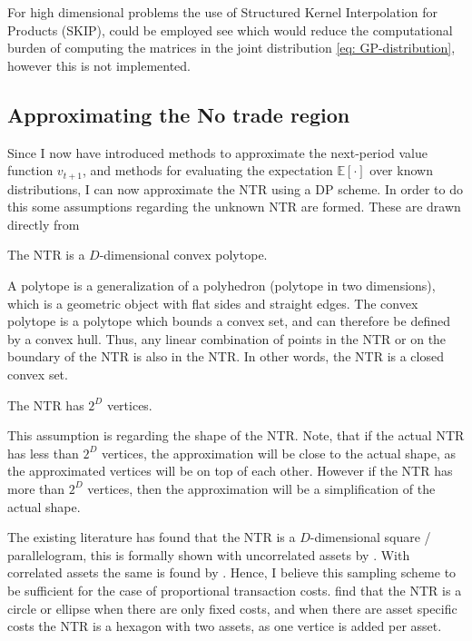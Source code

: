 \documentclass[11pt]{article}
\begin{document}
For high dimensional problems the use of Structured Kernel Interpolation for Products (SKIP), could be employed see \autocite{Garnder2018}
which would reduce the computational burden of computing the matrices in the joint distribution \eqref{eq: GP-distribution},
however this is not implemented.


\subsection{Approximating the No trade region} \label{Subsection: Approximating_NTR}
Since I now have introduced methods to approximate the next-period value function $v_{t+1}$, and methods for evaluating the expectation $\mathbb{E}[\cdot]$
over known distributions, I can now approximate the \ac{NTR} using a \ac{DP} scheme. In order to do this some assumptions regarding the unknown NTR are formed.
These are drawn directly from \autocite{Scheidegger2023}
\begin{assumption}\label{assumption: NTR-convex}
  The NTR is a $D$-dimensional convex polytope.
\end{assumption}
A polytope is a generalization of a polyhedron (polytope in two dimensions), which is a geometric object with flat sides and straight edges.
  The convex polytope is a polytope which bounds a convex set, and can therefore be defined by a convex hull. Thus, any linear combination of points in the \ac{NTR} or on the boundary of the \ac{NTR} is also in the \ac{NTR}.
  In other words, the \ac{NTR} is a closed convex set.
\begin{assumption}\label{assumption: NTR-vertices}
  The NTR has $2^{D}$ vertices.
\end{assumption}
This assumption is regarding the shape of the \ac{NTR}. Note, that if the actual \ac{NTR} has less than $2^{D}$ vertices, the approximation will be close to the actual shape, as the approximated vertices will be on top of each other.
However if the \ac{NTR} has more than $2^{D}$ vertices, then the approximation will be a simplification of the actual shape. 

The existing literature has found that the \ac{NTR} is a $D$-dimensional square / parallelogram, this is formally shown with uncorrelated assets by \autocite{liu2002}. With correlated assets the same is found by \autocite{CaiJuddXu2013,Dybvig2020}.
Hence, I believe this sampling scheme to be sufficient for the case of proportional transaction costs.
\autocite{Dybvig2020} find that the \ac{NTR} is a circle or ellipse when there are only fixed costs, and when there are asset specific costs the \ac{NTR} is a hexagon with two assets, as one vertice is added per asset.
\end{document}
